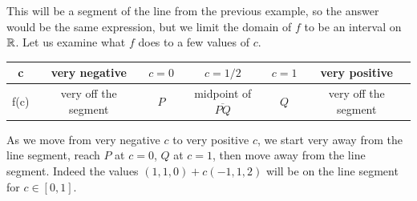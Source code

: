 This will be a segment of the line from the previous example, so the answer would be the same expression, but we limit the domain of $f$ to be an interval on $\mathbb{R}$. Let us examine what $f$ does to a few values of $c$.
\renewcommand{\arraystretch}{1.5}
\begin{center}
	\begin{tabular}{|c|c c c c c|} 
		\hline
		c & very negative & $c=0$ & $c=1/2$& $c=1$ & very positive \\ 
		\hline
		f(c) & very off the segment & $P$ & midpoint of $\overline{PQ}$& $Q$ & very off the segment \\ 
		\hline
	\end{tabular}
\end{center}
As we move from very negative $c$ to very positive $c$, we start very away from the line segment, reach $P$ at $c=0$, $Q$ at $c=1$, then move away from the line segment. 
Indeed the values $(1,1,0) + c(-1,1,2)$ will be on the line segment for $c\in[0,1]$.

